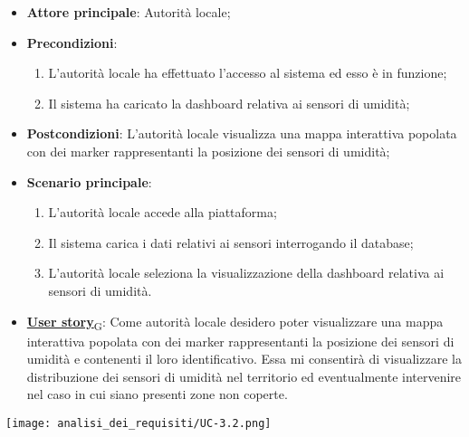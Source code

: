 \begin{itemize}
	\item \textbf{Attore principale}: Autorità locale;
	\item \textbf{Precondizioni}:
	      \begin{enumerate}
		      \item L'autorità locale ha effettuato l'accesso al sistema ed esso è in funzione;
		      \item Il sistema ha caricato la dashboard relativa ai sensori di umidità;
	      \end{enumerate}
	\item \textbf{Postcondizioni}: L'autorità locale visualizza una mappa interattiva popolata con dei marker rappresentanti la posizione dei sensori di umidità;
	\item \textbf{Scenario principale}:
	      \begin{enumerate}
		      \item L'autorità locale accede alla piattaforma;
		      \item Il sistema carica i dati relativi ai sensori interrogando il database;
		      \item L'autorità locale seleziona la visualizzazione della dashboard relativa ai sensori di umidità.
	      \end{enumerate}
	\item \href{https://7last.github.io/docs/rtb/documentazione-interna/glossario\#user-story}{\textbf{User story}\textsubscript{G}}:
	      Come autorità locale desidero poter visualizzare una mappa interattiva popolata con dei marker rappresentanti la posizione dei sensori di umidità
	      e contenenti il loro identificativo. Essa mi consentirà di visualizzare la distribuzione dei sensori di umidità nel territorio ed eventualmente intervenire nel caso in cui siano presenti zone non coperte.
\end{itemize}
\begin{center}
	\texttt{[image: analisi\_dei\_requisiti/UC-3.2.png]}
\end{center}

